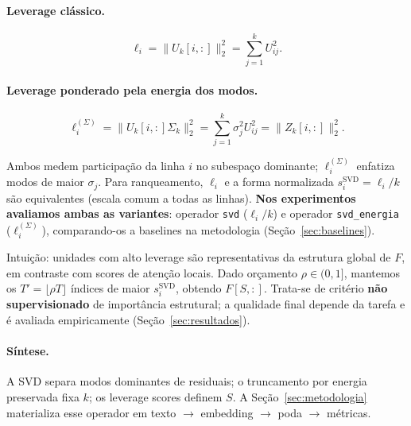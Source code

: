 \paragraph{Leverage clássico.}
$$
\ell_i = \|U_k[i,:]\|_2^2 = \sum_{j=1}^{k} U_{ij}^2.
$$

\paragraph{Leverage ponderado pela energia dos modos.}
$$
\ell_i^{(\Sigma)} = \|U_k[i,:]\Sigma_k\|_2^2 = \sum_{j=1}^{k} \sigma_j^2 U_{ij}^2 = \|Z_k[i,:]\|_2^2.
$$

Ambos medem participação da linha $i$ no subespaço dominante; $\ell_i^{(\Sigma)}$ enfatiza modos de maior $\sigma_j$. Para ranqueamento, $\ell_i$ e a forma normalizada $s_i^{\mathrm{SVD}} = \ell_i / k$ são equivalentes (escala comum a todas as linhas). \textbf{Nos experimentos avaliamos ambas as variantes}: operador \texttt{svd} ($\ell_i/k$) e operador \texttt{svd\_energia} ($\ell_i^{(\Sigma)}$), comparando-os a baselines na metodologia (Seção~\ref{sec:baselines}).

Intuição: unidades com alto leverage são representativas da estrutura global de $F$, em contraste com scores de atenção locais. Dado orçamento $\rho \in (0,1]$, mantemos os $T' = \lfloor \rho T \rfloor$ índices de maior $s_i^{\mathrm{SVD}}$, obtendo $F[S,:]$. Trata-se de critério \textbf{não supervisionado} de importância estrutural; a qualidade final depende da tarefa e é avaliada empiricamente (Seção~\ref{sec:resultados}).

\paragraph{Síntese.}
A SVD separa modos dominantes de residuais; o truncamento por energia preservada fixa $k$; os leverage scores definem $S$. A Seção~\ref{sec:metodologia} materializa esse operador em texto $\to$ embedding $\to$ poda $\to$ métricas.
